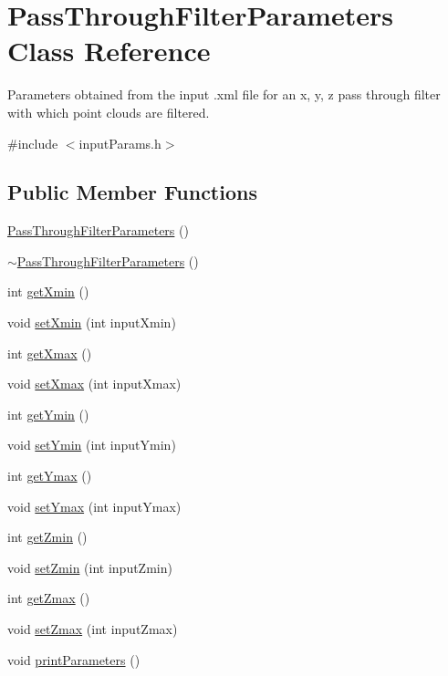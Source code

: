 \hypertarget{classPassThroughFilterParameters}{\section{Pass\-Through\-Filter\-Parameters Class Reference}
\label{classPassThroughFilterParameters}
}


Parameters obtained from the input .xml file for an x, y, z pass through filter with which point clouds are filtered.  




{\ttfamily \#include $<$input\-Params.\-h$>$}

\subsection*{Public Member Functions}
\begin{DoxyCompactItemize}
\item 
\hyperlink{classPassThroughFilterParameters_aeee830c3add31bc26c4b20338436606a}{Pass\-Through\-Filter\-Parameters} ()
\item 
\hyperlink{classPassThroughFilterParameters_a302a699d7f992a52ee382e1cbfd0552b}{$\sim$\-Pass\-Through\-Filter\-Parameters} ()
\item 
int \hyperlink{classPassThroughFilterParameters_a829a4fb0e47d05f4a7cf5d3f137d6287}{get\-Xmin} ()
\item 
void \hyperlink{classPassThroughFilterParameters_ae3911fb159d2ce12656dff58c7dcc15a}{set\-Xmin} (int input\-Xmin)
\item 
int \hyperlink{classPassThroughFilterParameters_aafc05594d99a2e20e1bbf58ac9d733eb}{get\-Xmax} ()
\item 
void \hyperlink{classPassThroughFilterParameters_ab104e7bf27ba27818623bb8eb59797da}{set\-Xmax} (int input\-Xmax)
\item 
int \hyperlink{classPassThroughFilterParameters_aac2001fe3a4c8b10fc5dfa390f16e3a9}{get\-Ymin} ()
\item 
void \hyperlink{classPassThroughFilterParameters_a0bcc133f12fbeaecd7cd280e930999b9}{set\-Ymin} (int input\-Ymin)
\item 
int \hyperlink{classPassThroughFilterParameters_aa32a6ad61ec0240d285fd23e2a36ee15}{get\-Ymax} ()
\item 
void \hyperlink{classPassThroughFilterParameters_aa3ea3933d3a7013109a2647f8ce388de}{set\-Ymax} (int input\-Ymax)
\item 
int \hyperlink{classPassThroughFilterParameters_a650d1ea63f945dae5bc89134c661dfd3}{get\-Zmin} ()
\item 
void \hyperlink{classPassThroughFilterParameters_ad2e7db71a6fa9e7d20b482209447aaf8}{set\-Zmin} (int input\-Zmin)
\item 
int \hyperlink{classPassThroughFilterParameters_a59133ee3ee1fd527bf8c70029d5a0ad7}{get\-Zmax} ()
\item 
void \hyperlink{classPassThroughFilterParameters_a9e4da1925fb0cf242401c59b540414db}{set\-Zmax} (int input\-Zmax)
\item 
void \hyperlink{classPassThroughFilterParameters_a17187468f6837e7271ebf5f02bf1dbdc}{print\-Parameters} ()
\end{DoxyCompactItemize}
